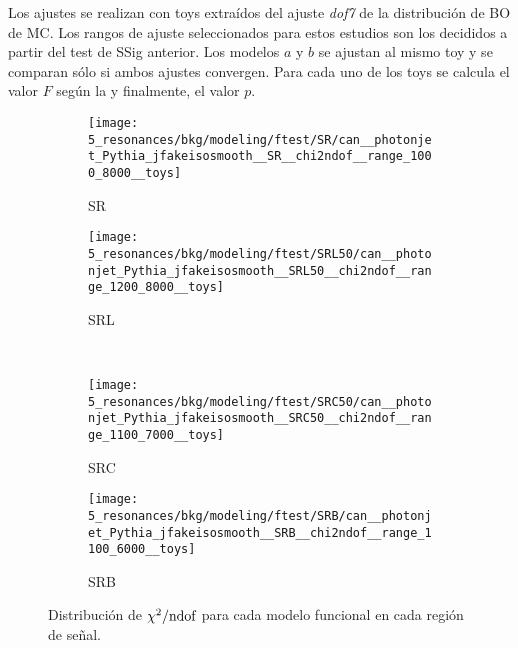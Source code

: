 Los ajustes se realizan con toys extraídos del ajuste \textit{dof7} de la distribución de \ac{BO} de \ac{MC}. Los rangos de ajuste seleccionados para estos estudios son los decididos a partir del test de \ac{SSig} anterior. Los modelos \(a\) y \(b\) se ajustan al mismo toy y se comparan sólo si ambos ajustes convergen. Para cada uno de los toys se calcula el valor \(F\) según la \Eqn{\ref{eq:bkg:modeling:preparation:ftest:ftest}} y finalmente, el valor \(p\).



\begin{figure}[ht!]
    \centering
    \begin{subfigure}[h]{0.49\linewidth}
        \centering
        \texttt{[image: 5\_resonances/bkg/modeling/ftest/SR/can\_\_photonjet\_Pythia\_jfakeisosmooth\_\_SR\_\_chi2ndof\_\_range\_1000\_8000\_\_toys]}
        \caption{SR}
    \end{subfigure}
    \begin{subfigure}[h]{0.49\linewidth}
        \centering
        \texttt{[image: 5\_resonances/bkg/modeling/ftest/SRL50/can\_\_photonjet\_Pythia\_jfakeisosmooth\_\_SRL50\_\_chi2ndof\_\_range\_1200\_8000\_\_toys]}
        \caption{SRL}
    \end{subfigure}
    \\
    \begin{subfigure}[h]{0.49\linewidth}
        \centering
        \texttt{[image: 5\_resonances/bkg/modeling/ftest/SRC50/can\_\_photonjet\_Pythia\_jfakeisosmooth\_\_SRC50\_\_chi2ndof\_\_range\_1100\_7000\_\_toys]}
        \caption{SRC}
    \end{subfigure}
    \begin{subfigure}[h]{0.49\linewidth}
        \centering
        \texttt{[image: 5\_resonances/bkg/modeling/ftest/SRB/can\_\_photonjet\_Pythia\_jfakeisosmooth\_\_SRB\_\_chi2ndof\_\_range\_1100\_6000\_\_toys]}
        \caption{SRB}
    \end{subfigure}
    \caption{Distribución de \(\chi^{2} / \text{ndof}\) para cada modelo funcional en cada región de señal.}
    \label{fig:bkg:modeling:preparation:ftest:chi2ndof}
\end{figure}

